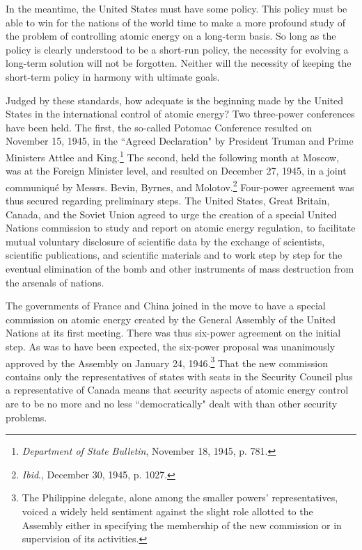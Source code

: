 In the meantime, the United States must have some policy. This policy must be able to win for the nations of the world time to make a more profound study of the problem of controlling atomic energy on a long-term basis. So long as the policy is clearly understood to be a short-run policy, the necessity for evolving a long-term solution will not be forgotten. Neither will the necessity of keeping the short-term policy in harmony with ultimate goals.

Judged by these standards, how adequate is the beginning made by the United States in the international control of atomic energy? Two three-power conferences have been held. The first, the so-called Potomac Conference resulted on November 15, 1945, in the ``Agreed Declaration" by President Truman and Prime Ministers Attlee and King.\footnote{\textit{Department of State Bulletin}, November 18, 1945, p. 781.} The second, held the following month at Moscow, was at the Foreign Minister level, and resulted on December 27, 1945, in a joint communiqu\'e by Messrs. Bevin, Byrnes, and Molotov.\footnote{\textit{Ibid}., December 30, 1945, p. 1027.} Four-power agreement was thus secured regarding preliminary steps. The United States, Great Britain, Canada, and the Soviet Union agreed to urge the creation of a special United Nations commission to study and report on atomic energy regulation, to facilitate mutual voluntary disclosure of scientific data by the exchange of scientists, scientific publications, and scientific materials and to work step by step for the eventual elimination of the bomb and other instruments of mass destruction from the arsenals of nations.

The governments of France and China joined in the move to have a special commission on atomic energy created by the General Assembly of the United Nations at its first meeting. There was thus six-power agreement on the initial step. As was to have been expected, the six-power proposal was unanimously approved by the Assembly on January 24, 1946.\footnote{The Philippine delegate, alone among the smaller powers' representatives, voiced a widely held sentiment against the slight role allotted to the Assembly either in specifying the membership of the new commission or in supervision of its activities.} That the new commission contains only the representatives of states with seats in the Security Council plus a representative of Canada means that security aspects of atomic energy control are to be no more and no less ``democratically" dealt with than other security problems.

